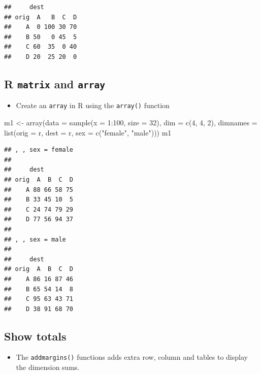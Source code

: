\documentclass[
]{book}
\newenvironment{Shaded}{\begin{snugshade}}{\end{snugshade}}
\newcommand{\AttributeTok}[1]{\textcolor[rgb]{0.77,0.63,0.00}{#1}}
\newcommand{\DecValTok}[1]{\textcolor[rgb]{0.00,0.00,0.81}{#1}}
\newcommand{\FunctionTok}[1]{\textcolor[rgb]{0.00,0.00,0.00}{#1}}
\newcommand{\NormalTok}[1]{#1}
\newcommand{\OtherTok}[1]{\textcolor[rgb]{0.56,0.35,0.01}{#1}}
\newcommand{\SpecialCharTok}[1]{\textcolor[rgb]{0.00,0.00,0.00}{#1}}
\newcommand{\StringTok}[1]{\textcolor[rgb]{0.31,0.60,0.02}{#1}}
\providecommand{\tightlist}{%
  \setlength{\itemsep}{0pt}\setlength{\parskip}{0pt}}
\begin{document}
\begin{verbatim}
##     dest
## orig  A   B  C  D
##    A  0 100 30 70
##    B 50   0 45  5
##    C 60  35  0 40
##    D 20  25 20  0
\end{verbatim}

\hypertarget{r-matrix-and-array-1}{%
\subsection{\texorpdfstring{R \texttt{matrix} and \texttt{array}}{R matrix and array}}\label{r-matrix-and-array-1}}

\begin{itemize}
\tightlist
\item
  Create an \texttt{array} in R using the \texttt{array()} function
\end{itemize}

\begin{Shaded}
\begin{Highlighting}[]
\NormalTok{m1 }\OtherTok{\textless{}{-}} \FunctionTok{array}\NormalTok{(}\AttributeTok{data =} \FunctionTok{sample}\NormalTok{(}\AttributeTok{x =} \DecValTok{1}\SpecialCharTok{:}\DecValTok{100}\NormalTok{, }\AttributeTok{size =} \DecValTok{32}\NormalTok{), }
            \AttributeTok{dim =} \FunctionTok{c}\NormalTok{(}\DecValTok{4}\NormalTok{, }\DecValTok{4}\NormalTok{, }\DecValTok{2}\NormalTok{), }
            \AttributeTok{dimnames =} \FunctionTok{list}\NormalTok{(}\AttributeTok{orig =}\NormalTok{ r, }\AttributeTok{dest =}\NormalTok{ r, }\AttributeTok{sex =} \FunctionTok{c}\NormalTok{(}\StringTok{"female"}\NormalTok{, }\StringTok{"male"}\NormalTok{)))}
\NormalTok{m1}
\end{Highlighting}
\end{Shaded}

\begin{verbatim}
## , , sex = female
## 
##     dest
## orig  A  B  C  D
##    A 88 66 58 75
##    B 33 45 10  5
##    C 24 74 79 29
##    D 77 56 94 37
## 
## , , sex = male
## 
##     dest
## orig  A  B  C  D
##    A 86 16 87 46
##    B 65 54 14  8
##    C 95 63 43 71
##    D 38 91 68 70
\end{verbatim}

\hypertarget{show-totals}{%
\subsection{Show totals}\label{show-totals}}

\begin{itemize}
\tightlist
\item
  The \texttt{addmargins()} functions adds extra row, column and tables to display the dimension sums.
\end{itemize}
\end{document}
